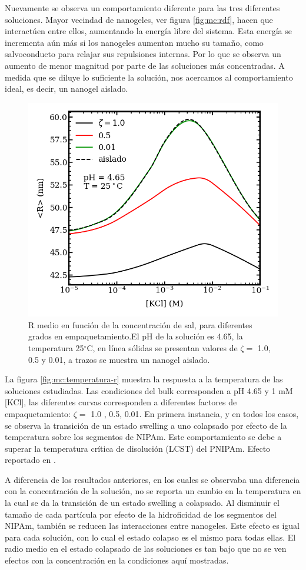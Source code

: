 	Nuevamente se observa un comportamiento diferente para las tres diferentes soluciones. Mayor vecindad de nanogeles, ver figura \ref{fig:mc:rdf}, hacen que interact\'uen entre ellos, aumentando la energ\'ia libre del sistema. Esta energ\'ia se incrementa a\'un m\'as si los nanogeles aumentan mucho su tama\~no, como salvoconducto para relajar sus repulsiones internas. Por lo que se observa un aumento de menor magnitud por parte de las soluciones m\'as concentradas. A medida que se diluye lo suficiente la soluci\'on, nos acercamos al comportamiento ideal, es decir, un nanogel aislado.
	
	
	
	\begin{figure}
		\centering
		\includegraphics[width=0.45\linewidth]{Figures/graph-mc/salt-r.png}
		\caption{R medio en funci\'on de la concentraci\'on de sal, para diferentes grados en empaquetamiento.El pH de la soluci\'on es 4.65, la temperatura 25$^\circ$C, en l\'inea s\'olidas se presentan valores de  $\zeta=$ 1.0, 0.5 y 0.01, a trazos se muestra un nanogel aislado.}
		\label{fig:mc:reentrante}
	\end{figure}
	
	La figura \ref{fig:mc:temperatura-r} muestra la respuesta a la temperatura de las soluciones estudiadas. Las condiciones del bulk corresponden a pH 4.65 y 1 mM [KCl], las diferentes curvas corresponden a diferentes factores de empaquetamiento: $\zeta =$  1.0 , 0.5, 0.01.
	En primera instancia, y en todos los casos,  se observa la transici\'on de un estado swelling a uno colapsado por efecto de la temperatura sobre los segmentos de NIPAm.
	Este comportamiento se debe a superar la temperatura cr\'itica de disoluci\'on (LCST) del PNIPAm. Efecto reportado en \cite{perez2021thermodynamic}.
	
	A diferencia de los resultados anteriores, en los cuales se observaba una diferencia con la concentraci\'on de la soluci\'on, no se reporta un cambio en la temperatura en la cual se da la transici\'on de un estado swelling a colapsado. 
	Al disminuir el tama\~no de cada part\'icula por efecto de la hidroficidad de los segmentos del NIPAm, tambi\'en se reducen las interacciones entre nanogeles. Este efecto es igual para cada soluci\'on, con lo cual el estado colapso es el mismo para todas ellas.
	El radio medio en el estado colapsado de las soluciones es tan bajo que no se ven efectos con la concentraci\'on en la condiciones aqu\'i mostradas. 
	
